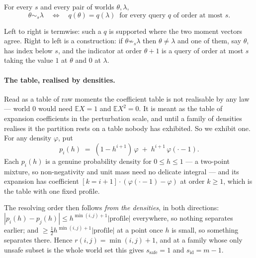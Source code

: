 \begin{theorem}
\label{thm:indist}
For every $s$ and every pair of worlds $\theta,\lambda$,
\[
\theta\sim_{s}\lambda
\quad\Longleftrightarrow\quad
q(\theta)=q(\lambda)\ \text{ for every query } q \text{ of order at most } s .
\]
\end{theorem}

Left to right is termwise: such a $q$ is supported where the two moment vectors agree.
Right to left is a construction: if $\theta\not\sim_{s}\lambda$ then $\theta\ne\lambda$
and one of them, say $\theta$, has index below $s$, and the indicator at order $\theta+1$
is a query of order at most $s$ taking the value $1$ at $\theta$ and $0$ at $\lambda$.


\paragraph{The table, realised by densities.}
Read as a table of raw moments the coefficient table is not realisable by any law --- world
$0$ would need $\mathbb EX=1$ and $\mathbb EX^{2}=0$. It is meant as the table of expansion
coefficients in the perturbation scale, and until a family of densities realises it the
partition rests on a table nobody has exhibited. So we exhibit one. For any density
$\varphi$, put
\[
p_{i}(h)\;=\;(1-h^{i+1})\,\varphi\;+\;h^{i+1}\,\varphi(\cdot-1).
\]
Each $p_{i}(h)$ is a genuine probability density for $0\le h\le1$ --- a two-point mixture, so
non-negativity and unit mass need no delicate integral --- and its expansion has coefficient
$[k=i+1]\cdot(\varphi(\cdot-1)-\varphi)$ at order $k\ge1$, which is the table with one fixed
profile.

The resolving order then follows \emph{from the densities}, in both directions:
$|p_{i}(h)-p_{j}(h)|\le h^{\min(i,j)+1}|\text{profile}|$ everywhere, so nothing separates
earlier; and $\ge\tfrac12h^{\min(i,j)+1}|\text{profile}|$ at a point once $h$ is small, so
something separates there. Hence $r(i,j)=\min(i,j)+1$, and at a family whose only unsafe
subset is the whole world set this gives $s_{\mathrm{safe}}=1$ and $s_{\mathrm{id}}=m-1$.


